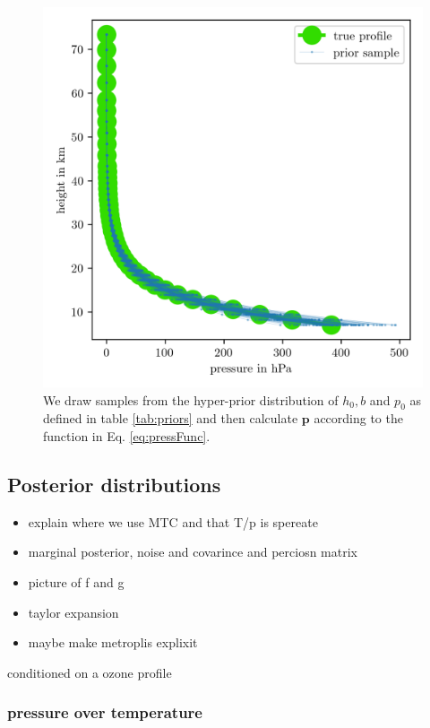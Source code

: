 \begin{figure}[ht!]
	\centering
	\includegraphics{PriorPressPostMeanSigm.png}
	\caption[Prior Samples of $\bm{p}$ according to the respective hyper-prior distribution.]{We draw samples from the hyper-prior distribution of $h_0, b$ and $p_0$ as defined in table \ref{tab:priors} and then calculate $\bm{p}$ according to the function in Eq. \ref{eq:pressFunc}.}
	\label{fig:PriorPress}
\end{figure}


\subsection{Posterior distributions}
\begin{itemize}
	\item explain where we use MTC and that T/p is spereate
	\item marginal posterior, noise and covarince and perciosn matrix
	\item picture of f and g
	\item taylor expansion
	\item maybe make  metroplis explixit
\end{itemize}
conditioned on a ozone profile
\subsubsection{pressure over temperature}

